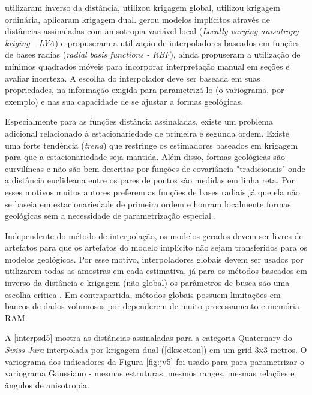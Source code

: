  utilizaram inverso da distância,  utilizou krigagem  global,  utilizou krigagem ordinária,  aplicaram krigagem dual.  gerou modelos implícitos através de distâncias assinaladas com anisotropia variável local (\textit{Locally varying anisotropy kriging - LVA}) e  propuseram a utilização de interpoladores baseados em funções de bases radias (\textit{radial basis functions - RBF}),  ainda propuseram a utilização de mínimos quadrados móveis para incorporar interpretação manual em seções e avaliar incerteza. A escolha do interpolador deve ser baseada em suas propriedades, na informação exigida para parametrizá-lo (o variograma, por exemplo) e nas sua capacidade de se ajustar a formas geológicas.

Especialmente para as funções distância assinaladas, existe um problema adicional relacionado à estacionariedade de primeira e segunda ordem. Existe uma forte tendência (\textit{trend}) que restringe os estimadores baseados em krigagem para que a estacionariedade seja mantida. Além disso, formas geológicas são curvilíneas e não são bem descritas por funções de covariância "tradicionais" onde a distância euclideana entre os pares de pontos são medidas em linha reta. Por esses motivos muitos autores preferem as funções de bases radiais já que ela não se baseia em estacionariedade de primeira ordem e honram localmente formas geológicas sem a necessidade de parametrização especial \cite{martin2017implicitmodeling}.

Independente do método de interpolação, os modelos gerados devem ser livres de artefatos para que os artefatos do modelo implícito não sejam transferidos para os modelos geológicos. Por esse motivo, interpoladores globais devem ser usados por utilizarem todas as amostras em cada estimativa, já para os métodos baseados em inverso da distância e krigagem (não global) os parâmetros de busca são uma escolha crítica \cite{martin2017implicitmodeling}. Em contrapartida, métodos globais possuem limitações em bancos de dados volumosos por dependerem de muito processamento e memória RAM.

A \autoref{interpsd5} mostra as distâncias assinaladas para a categoria Quaternary do \textit{Swiss Jura} interpolada por krigagem dual (\autoref{dksection}) em um grid 3x3 metros. O variograma dos indicadores da Figura \autoref{fig:jv5} foi usado para para parametrizar o variograma Gaussiano - mesmas estruturas, mesmos ranges, mesmas relações e ângulos de anisotropia.

